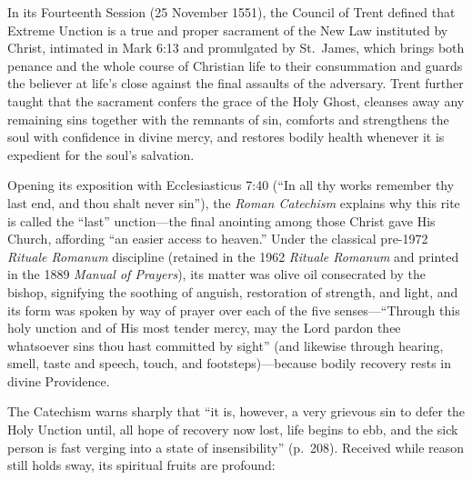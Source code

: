 In its Fourteenth Session (25 November 1551), the Council of Trent defined that Extreme Unction is a true and proper sacrament of the New Law instituted by Christ, intimated in Mark 6:13 and promulgated by St.\ James, which brings both penance and the whole course of Christian life to their consummation and guards the believer at life's close against the final assaults of the adversary. Trent further taught that the sacrament confers the grace of the Holy Ghost, cleanses away any remaining sins together with the remnants of sin, comforts and strengthens the soul with confidence in divine mercy, and restores bodily health whenever it is expedient for the soul's salvation.

Opening its exposition with Ecclesiasticus 7:40 (``In all thy works remember thy last end, and thou shalt never sin''), the \emph{Roman Catechism} explains why this rite is called the ``last'' unction---the final anointing among those Christ gave His Church, affording ``an easier access to heaven.'' Under the classical pre-1972 \emph{Rituale Romanum} discipline (retained in the 1962 \emph{Rituale Romanum} and printed in the 1889 \emph{Manual of Prayers}), its matter was olive oil consecrated by the bishop, signifying the soothing of anguish, restoration of strength, and light, and its form was spoken by way of prayer over each of the five senses---``Through this holy unction and of His most tender mercy, may the Lord pardon thee whatsoever sins thou hast committed by sight'' (and likewise through hearing, smell, taste and speech, touch, and footsteps)---because bodily recovery rests in divine Providence.

The Catechism warns sharply that ``it is, however, a very grievous sin to defer the Holy Unction until, all hope of recovery now lost, life begins to ebb, and the sick person is fast verging into a state of insensibility'' (p.\ 208). Received while reason still holds sway, its spiritual fruits are profound:

